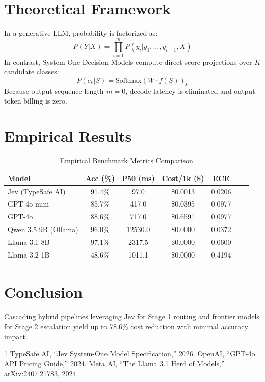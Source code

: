 \documentclass[10pt,journal,compsoc]{IEEEtran}
\begin{document}
\section{Theoretical Framework}
In a generative LLM, probability is factorized as:
\begin{equation}
P(Y | X) = \prod_{i=1}^{m} P(y_i | y_{1}, \dots, y_{i-1}, X)
\end{equation}
In contrast, System-One Decision Models compute direct score projections over $K$ candidate classes:
\begin{equation}
P(c_k | S) = \text{Softmax}(W \cdot f(S))_k
\end{equation}
Because output sequence length $m=0$, decode latency is eliminated and output token billing is zero.

\section{Empirical Results}

\begin{table}[htbp]
\caption{Empirical Benchmark Metrics Comparison}
\label{tab:results}
\centering
\begin{tabular}{lcccccc}
\toprule
\textbf{Model} & \textbf{Acc (\%)} & \textbf{P50 (ms)} & \textbf{Cost/1k (\$)} & \textbf{ECE} \\
\midrule
Jev (TypeSafe AI) & 91.4\% & 97.0 & \$0.0013 & 0.0206 \\
GPT-4o-mini & 85.7\% & 417.0 & \$0.0395 & 0.0977 \\
GPT-4o & 88.6\% & 717.0 & \$0.6591 & 0.0977 \\
Qwen 3.5 9B (Ollama) & 96.0\% & 12530.0 & \$0.0000 & 0.0372 \\
Llama 3.1 8B & 97.1\% & 2317.5 & \$0.0000 & 0.0600 \\
Llama 3.2 1B & 48.6\% & 1011.1 & \$0.0000 & 0.4194 \\
\bottomrule
\end{tabular}
\end{table}

\section{Conclusion}
Cascading hybrid pipelines leveraging Jev for Stage 1 routing and frontier models for Stage 2 escalation yield up to 78.6\% cost reduction with minimal accuracy impact.


\begin{thebibliography}{1}
 TypeSafe AI, ``Jev System-One Model Specification,'' 2026.
 OpenAI, ``GPT-4o API Pricing Guide,'' 2024.
 Meta AI, ``The Llama 3.1 Herd of Models,'' arXiv:2407.21783, 2024.
\end{thebibliography}
\end{document}
